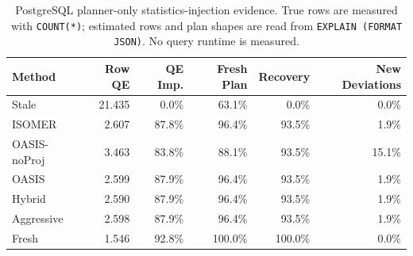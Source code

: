 \begin{table}[t]
  \centering
  \small
  \caption{PostgreSQL planner-only statistics-injection evidence. True rows are measured with \texttt{COUNT(*)}; estimated rows and plan shapes are read from \texttt{EXPLAIN (FORMAT JSON)}. No query runtime is measured.}
  \label{tab:postgres_planner_stats_injection}
  \setlength{\tabcolsep}{4pt}
  \begin{tabular}{lrrrrr}
    \toprule
    Method & Row QE & QE Imp. & Fresh Plan & Recovery & New Deviations \\
    \midrule
    Stale & 21.435 & 0.0\% & 63.1\% & 0.0\% & 0.0\% \\
    ISOMER & 2.607 & 87.8\% & 96.4\% & 93.5\% & 1.9\% \\
    OASIS-noProj & 3.463 & 83.8\% & 88.1\% & 93.5\% & 15.1\% \\
    OASIS & 2.599 & 87.9\% & 96.4\% & 93.5\% & 1.9\% \\
    Hybrid & 2.590 & 87.9\% & 96.4\% & 93.5\% & 1.9\% \\
    Aggressive & 2.598 & 87.9\% & 96.4\% & 93.5\% & 1.9\% \\
    Fresh & 1.546 & 92.8\% & 100.0\% & 100.0\% & 0.0\% \\
    \bottomrule
  \end{tabular}
\end{table}

